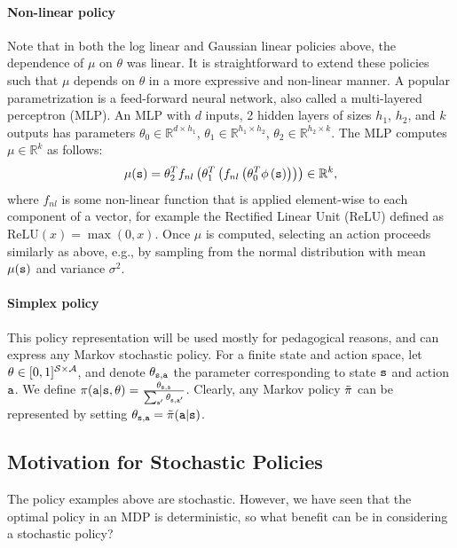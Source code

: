 \paragraph{Non-linear policy} Note that in both the log linear and Gaussian linear policies above, the dependence of $\mu$ on $\theta$ was linear. It is straightforward to extend these policies such that $\mu$ depends on $\theta$ in a more expressive and non-linear manner. A popular parametrization is a feed-forward neural network, also called a multi-layered perceptron (MLP). An MLP with $d$ inputs, 2 hidden layers of sizes $h_1$, $h_2$, and $k$ outputs has parameters $\theta_0 \in \mathbb{R}^{d \times h_1}$, $\theta_1 \in \mathbb{R}^{h_1 \times h_2}$, $\theta_2 \in \mathbb{R}^{h_2 \times k}$. The MLP computes $\mu\in \mathbb{R}^{k}$ as follows:
\begin{equation*}
    \mu({\tt s}) = \theta_2^T f_{nl}\left(\theta_1^T\left( f_{nl}\left(\theta_0^T \phi\left({\tt s} \right)\right)\right)\right) \in \mathbb{R}^{k},
\end{equation*}
where $f_{nl}$ is some non-linear function that is applied element-wise to each component of a vector, for example the Rectified Linear Unit (ReLU) defined as $\text{ReLU}(x) = \max(0, x)$. Once $\mu$ is computed, selecting an
action proceeds similarly as above, e.g., by sampling from the normal distribution with mean
$\mu({\tt s})$ and variance $\sigma^2$.

\paragraph{Simplex policy} This policy representation will be used mostly for pedagogical reasons, and can express any Markov stochastic policy. For a finite state and action space, let $\theta \in [0,1]^{\mathcal{S} \times \mathcal{A}}$, and denote $\theta_{{\tt s},{\tt a}}$ the parameter corresponding to state ${\tt s}$ and action ${\tt a}$. We define $\pi({\tt a}|{\tt s},\theta) = \frac{\theta_{{\tt s},{\tt a}}}{\sum_{{\tt a}'} \theta_{{\tt s},{\tt a}'}}$. Clearly, any Markov policy $\tilde{\pi}$ can be represented by setting $\theta_{{\tt s},{\tt a}} = \tilde{\pi}({\tt a}|{\tt s})$.

\subsection{Motivation for Stochastic Policies}
The policy examples above are stochastic. However, we have seen that the optimal policy in an MDP is deterministic, so
what benefit can be in considering a stochastic policy?

